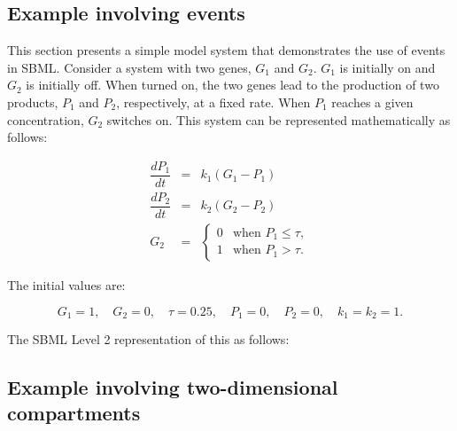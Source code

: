 

\subsection{Example involving events}
\label{sec:eventeg}

This section presents a simple model system that demonstrates the
use of events in SBML.  Consider a system with two genes,
$G_1$ and $G_2$.  $G_1$ is initially
on and $G_2$ is initially off.  When turned on, the two
genes lead to the production of two products, $P_1$ and $P_2$,
respectively, at a fixed rate.  When $P_1$ reaches a given
concentration, $G_2$ switches on.  This system can be
represented mathematically as follows:
\begin{linenomath}
\begin{eqnarray*}
  \dfrac{d P_1}{d t} & = & k_1 (G_1 - P_1)\\[3pt]
  \dfrac{d P_2}{d t} & = & k_2 (G_2 - P_2)\\
  G_2 & = &
    \begin{cases}
      0 & \text{when $P_1 \leq \tau$},\\
      1 & \text{when $P_1 > \tau$}.
    \end{cases}
\end{eqnarray*}
\end{linenomath}

The initial values are:
\begin{linenomath}
\begin{equation*}
  G_1 = 1, \quad G_2 = 0, \quad \tau = 0.25, \quad P_1 = 0, \quad P_2 = 0, \quad k_1 = k_2 = 1.
\end{equation*}
\end{linenomath}

The SBML Level 2 representation of this as follows:



\subsection{Example involving two-dimensional compartments}
\label{sec:two-dimensional-eg}

